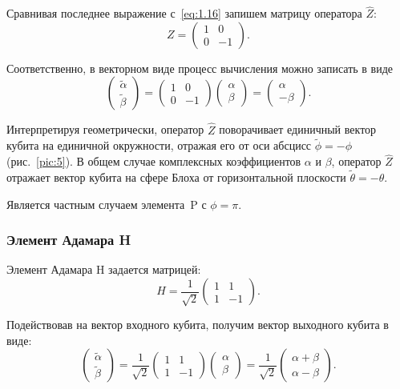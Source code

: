 \documentclass[pscyr,notitlepage]{hedwork}
\newcommand{\eq}[1]{\eqref{eq:#1}}
\newcommand{\pic}[1]{\ref{pic:#1}}
\renewcommand{\~}[1]{\widetilde{#1}}
\begin{document}
  Сравнивая последнее выражение с~\eq{1.16} запишем матрицу оператора
  \( \hat{Z} \):
  \[
    Z =
    \begin{pmatrix}
      1 & 0 \\ 0 & -1
    \end{pmatrix}.
  \]
  
  Соответственно, в векторном виде процесс вычисления можно записать в виде
  \[
    \begin{pmatrix}
      \~\alpha \\ \~\beta
    \end{pmatrix} =
    \begin{pmatrix}
      1 & 0 \\ 0 & -1
    \end{pmatrix}
    \begin{pmatrix}
      \alpha \\ \beta
    \end{pmatrix} =
    \begin{pmatrix}
      \alpha \\ -\beta
    \end{pmatrix}.
  \]
  
  Интерпретируя геометрически, оператор \( \hat{Z} \) поворачивает единичный
  вектор кубита на единичной окружности, отражая его от оси абсцисс
  \( \~\phi = -\phi \) (рис.~\pic{5}). В общем случае комплексных коэффициентов
  \( \alpha \) и \( \beta \), оператор \( \hat{Z} \) отражает вектор кубита на
  сфере Блоха от горизонтальной плоскости \( \~\theta = -\theta \).
  
  Является частным случаем элемента~P с \( \phi = \pi \).~\cite{main,task}
  
  \subsubsection{Элемент Адамара H}
  Элемент Адамара H задается матрицей:
  \[
    H = \frac{1}{\sqrt{2}}
    \begin{pmatrix}
      1 & 1 \\ 1 & -1
    \end{pmatrix}.
  \]
  
  Подействовав на вектор входного кубита, получим вектор выходного кубита в
  виде:
  \[
    \begin{pmatrix}
      \~\alpha \\ \~\beta
    \end{pmatrix} = \frac{1}{\sqrt{2}}
    \begin{pmatrix}
      1 & 1 \\ 1 & -1
    \end{pmatrix}
    \begin{pmatrix}
      \alpha \\ \beta
    \end{pmatrix} = \frac{1}{\sqrt{2}}
    \begin{pmatrix}
      \alpha + \beta \\ \alpha - \beta
    \end{pmatrix}.
  \]
  
\end{document}
